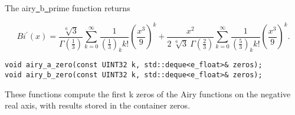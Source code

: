 \vspace{6.0pt}

 The {\courier airy\underline\ b\underline\ prime} function
returns~\cite{wolframfunctions:website}

\begin{equation}
Bi^{\prime}(x) =
\frac{\sqrt[6]{3}}{\Gamma(\frac{1}{3})}
\sum_{k=0}^{\infty} \frac{1}{\left(\frac{1}{3}\right)_{k} k!}
\left(\frac{x^3}{9}\right)^k
+
\frac{x^2}{2\ \sqrt[6]{3}\ \Gamma(\frac{2}{3})}
\sum_{k=0}^{\infty} \frac{1}{\left(\frac{5}{3}\right)_{k} k!}
\left(\frac{x^3}{9}\right)^k.
\end{equation}

\vspace{6.0pt}

\begin{lstlisting}
void airy_a_zero(const UINT32 k, std::deque<e_float>& zeros);
void airy_b_zero(const UINT32 k, std::deque<e_float>& zeros);
\end{lstlisting}

\vspace{6.0pt}

 These functions compute the first {\courier k} zeros of the
Airy functions on the negative real axis, with results stored in the
container {\courier zeros}.

